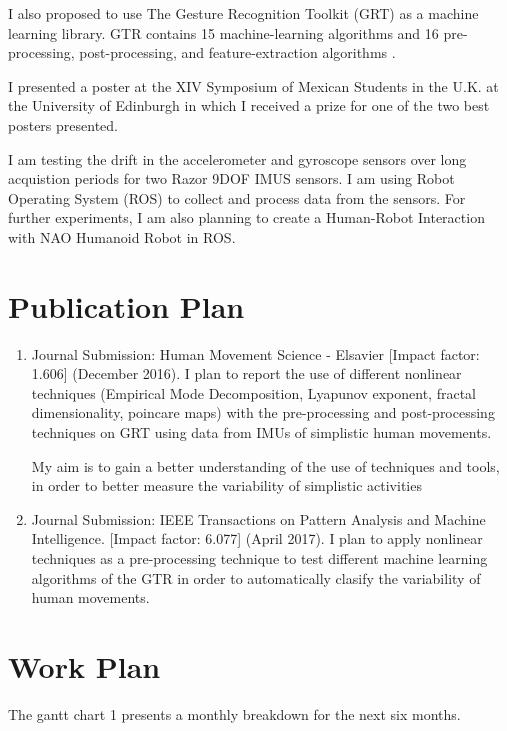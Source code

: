 \documentclass[11pt,journal,onecolumn,compsoc]{IEEEtran}
\begin{document}
I also proposed to use The Gesture Recognition Toolkit (GRT) as a machine learning library.
GTR contains 15 machine-learning algorithms and 16 pre-processing, post-processing, and feature-extraction algorithms 
\cite{Gillian2014}.

I presented a poster at the XIV Symposium of Mexican Students in the U.K. at the University of Edinburgh
in which I received a prize for one of the two best posters presented.

I am testing the drift in the accelerometer and gyroscope sensors over long acquistion periods for two Razor 9DOF IMUS sensors. 
I am using Robot Operating System (ROS) to collect and process data from the sensors.
For further experiments, I am also planning  to create a Human-Robot Interaction with NAO Humanoid Robot in ROS.


\section{Publication Plan}

\begin{enumerate}
 \item Journal Submission: Human Movement Science - Elsavier [Impact factor: 1.606] (December 2016).
I plan to report the use of different nonlinear techniques 
(Empirical Mode Decomposition, Lyapunov exponent, fractal dimensionality, poincare maps)
with the pre-processing and post-processing techniques on GRT using data from IMUs of simplistic human movements.

My aim is to gain a better understanding of the use of techniques and tools,
in order to better measure the variability of simplistic activities

\item Journal Submission: IEEE Transactions on Pattern Analysis and Machine Intelligence.
[Impact factor: 6.077] (April 2017).
I plan to apply nonlinear techniques as a pre-processing technique 
to test different machine learning algorithms of the GTR in order 
to automatically clasify the variability of human movements. 


\end{enumerate}




\section{Work Plan} 
The gantt chart 1 presents a monthly breakdown for the next six months.
\end{document}
